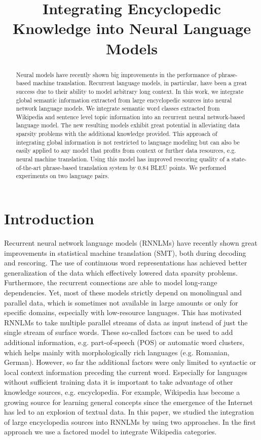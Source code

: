\documentclass[a4paper]{article}
\title{Integrating Encyclopedic Knowledge into Neural Language Models}
\begin{document}
\maketitle
%
\begin{abstract}
Neural models have recently shown big improvements in the performance of phrase-based machine translation. Recurrent language models, in particular, have been a great success due to their ability to model arbitrary long context. In this work, we integrate global semantic information extracted from large encyclopedic sources into neural network language models. We integrate semantic word classes extracted from Wikipedia and sentence level topic information into an recurrent neural network-based language model.
The new resulting models exhibit great potential in alleviating data sparsity problems with the additional knowledge provided. This approach of integrating global information is not restricted to language modeling but can also be easily applied to any model that profits from context or further data resources, e.g. neural machine translation. Using this model has improved rescoring quality of a state-of-the-art phrase-based translation system by 0.84 BLEU points. We performed experiments on two language pairs.



\end{abstract}


%
\section{Introduction}
Recurrent neural network language models (RNNLMs) have recently shown great improvements in statistical machine translation (SMT), both during decoding and rescoring. The use of continuous word representations has achieved better generalization of the data which effectively lowered data sparsity problems. Furthermore, the recurrent connections are able to model long-range dependencies. Yet, most of these models strictly depend on monolingual and parallel data, which is sometimes not available in large amounts or only for specific domains, especially with low-resource languages.
This has motivated RNNLMs to take multiple parallel streams of data as input instead of just the single stream of surface words. These so-called factors can be used to add additional information, e.g. part-of-speech (POS) or automatic word clusters, which helps mainly with morphologically rich languages (e.g. Romanian, German). However, so far the additional factors were only limited to syntactic or local context information preceding the current word. Especially for languages without sufficient training data it is important to take advantage of other knowledge sources, e.g. encyclopedia. For example, Wikipedia has become a growing source for learning general concepts since the emergence of the Internet has led to an explosion of textual data. 
In this paper, we studied the integration of large encyclopedia sources into RNNLMs by using two approaches. 
In the first approach we use a factored model to integrate Wikipedia categories. 
\end{document}
